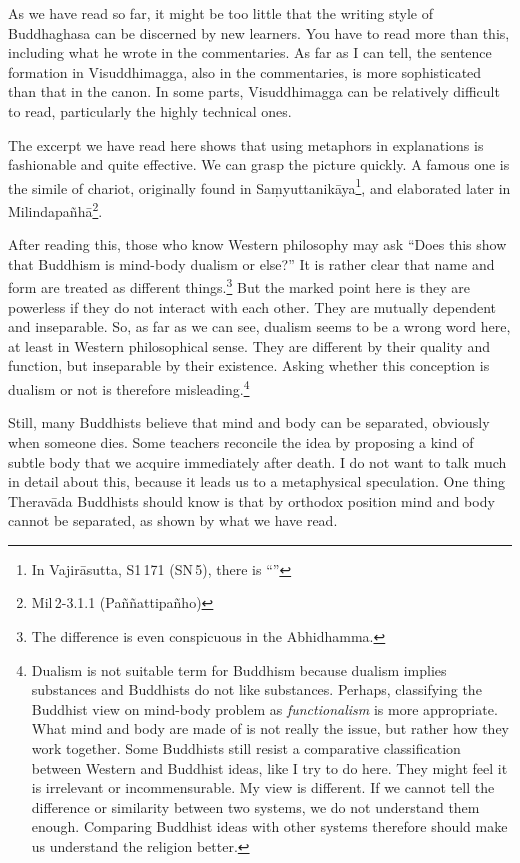 As we have read so far, it might be too little that the writing style of Buddhaghasa can be discerned by new learners. You have to read more than this, including what he wrote in the commentaries. As far as I can tell, the sentence formation in Visuddhimagga, also in the commentaries, is more sophisticated than that in the canon. In some parts, Visuddhimagga can be relatively difficult to read, particularly the highly technical ones.

The excerpt we have read here shows that using metaphors in explanations is fashionable and quite effective. We can grasp the picture quickly. A famous one is the simile of chariot, originally found in Sa\d myuttanik\=aya\footnote{In Vajir\=asutta, S1\,171 (SN\,5), there is ``''}, and elaborated later in Milindapa\~nh\=a\footnote{Mil\,2-3.1.1 (Pa\~n\~nattipa\~nho)}.

After reading this, those who know Western philosophy may ask ``Does this show that Buddhism is mind-body dualism or else?'' It is rather clear that name and form are treated as different things.\footnote{The difference is even conspicuous in the Abhidhamma.} But the marked point here is they are powerless if they do not interact with each other. They are mutually dependent and inseparable. So, as far as we can see, dualism seems to be a wrong word here, at least in Western philosophical sense. They are different by their quality and function, but inseparable by their existence. Asking whether this conception is dualism or not is therefore misleading.\footnote{Dualism is not suitable term for Buddhism because dualism implies substances and Buddhists do not like substances. Perhaps, classifying the Buddhist view on mind-body problem as \emph{functionalism} is more appropriate. What mind and body are made of is not really the issue, but rather how they work together. Some Buddhists still resist a comparative classification between Western and Buddhist ideas, like I try to do here. They might feel it is irrelevant or incommensurable. My view is different. If we cannot tell the difference or similarity between two systems, we do not understand them enough. Comparing Buddhist ideas with other systems therefore should make us understand the religion better.}

Still, many Buddhists believe that mind and body can be separated, obviously when someone dies. Some teachers reconcile the idea by proposing a kind of subtle body that we acquire immediately after death. I do not want to talk much in detail about this, because it leads us to a metaphysical speculation. One thing Therav\=ada Buddhists should know is that by orthodox position mind and body cannot be separated, as shown by what we have read.

